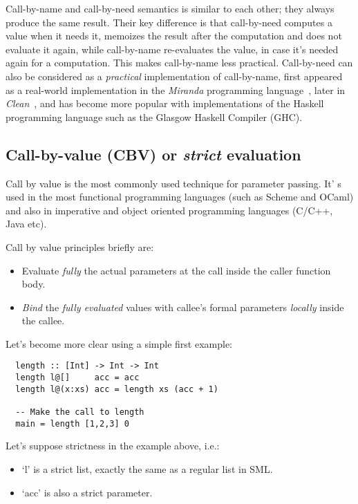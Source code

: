 \documentclass[diploma]{softlab-thesis}
\begin{document}
Call-by-name and call-by-need semantics is similar to each other; they always produce the same result.
Their key difference is that call-by-need computes a value when it needs it, memoizes the result after the computation 
and does not evaluate it again, while call-by-name re-evaluates the value, in case it's needed again for a computation.
This makes call-by-name less practical. Call-by-need can also be considered as a \textit{practical} implementation 
of call-by-name, first appeared as a real-world implementation in the \textit{Miranda} programming 
language~\cite{Turner:1985:MNF:5280.5281}, later in \textit{Clean}~\cite{Plasmeijer:1999:KCU:606666.606670}, and has become more popular
with implementations of the Haskell programming language such as the Glasgow Haskell Compiler (GHC).

\subsection {Call-by-value (CBV) or \textit{strict} evaluation}
\label{sec:cbv}

Call by value is the most commonly used technique for parameter passing. It' s used in the most functional 
programming languages (such as Scheme and OCaml) and also in imperative and object oriented programming 
languages (C/C++, Java etc).

\par Call by value principles briefly are:
\begin{itemize}
  \item Evaluate \textit{fully} the actual parameters at the call inside the caller function body.
  \item \textit{Bind} the \textit{fully evaluated} values with callee's formal parameters \textit{locally} inside the callee.
\end{itemize}

Let's become more clear using a simple first example:
\begin{verbatim}
  length :: [Int] -> Int -> Int
  length l@[]     acc = acc 
  length l@(x:xs) acc = length xs (acc + 1)

  -- Make the call to length
  main = length [1,2,3] 0
\end{verbatim}

Let's suppose strictness in the example above, i.e.:
\begin{itemize}
  \item `l' is a strict list, exactly the same as a regular list in SML.
  \item  `acc' is also a strict parameter. 
\end{itemize}
\end{document}
